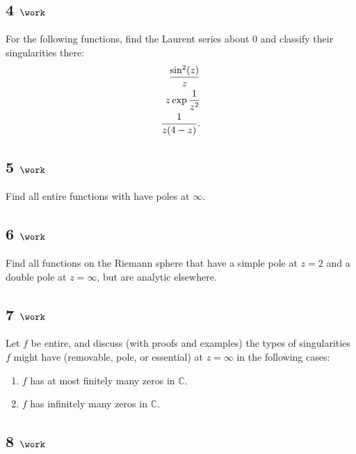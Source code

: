 \hypertarget{work-43}{%
\subsection{\texorpdfstring{4
\(\work\)}{4 \textbackslash work}}\label{work-43}}

For the following functions, find the Laurent series about \(0\) and
classify their singularities there:
\begin{align*}
{\sin^2(z) \over z} \\
z \exp{1\over z^2} \\
{1 \over z(4-z)}
.\end{align*}

\hypertarget{work-44}{%
\subsection{\texorpdfstring{5
\(\work\)}{5 \textbackslash work}}\label{work-44}}

Find all entire functions with have poles at \(\infty\).

\hypertarget{work-45}{%
\subsection{\texorpdfstring{6
\(\work\)}{6 \textbackslash work}}\label{work-45}}

Find all functions on the Riemann sphere that have a simple pole at
\(z=2\) and a double pole at \(z=\infty\), but are analytic elsewhere.

\hypertarget{work-46}{%
\subsection{\texorpdfstring{7
\(\work\)}{7 \textbackslash work}}\label{work-46}}

Let \(f\) be entire, and discuss (with proofs and examples) the types of
singularities \(f\) might have (removable, pole, or essential) at
\(z=\infty\) in the following cases:

\begin{enumerate}
\def\labelenumi{\arabic{enumi}.}
\tightlist
\item
  \(f\) has at most finitely many zeros in \({\mathbb{C}}\).
\item
  \(f\) has infinitely many zeros in \({\mathbb{C}}\).
\end{enumerate}

\hypertarget{work-47}{%
\subsection{\texorpdfstring{8
\(\work\)}{8 \textbackslash work}}\label{work-47}}

